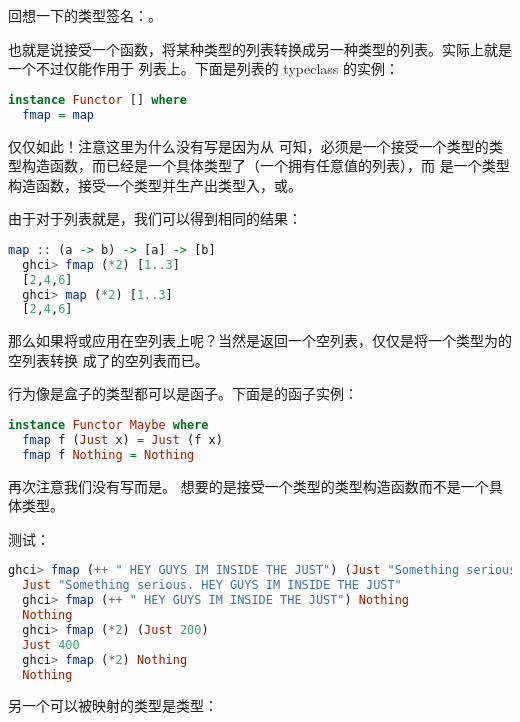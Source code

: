 \documentclass[./main.tex]{subfiles}
\begin{document}
回想一下的类型签名：。

也就是说接受一个函数，将某种类型的列表转换成另一种类型的列表。实际上就是一个不过仅能作用于
列表上。下面是列表的 typeclass 的实例：

\begin{lstlisting}[language=Haskell]
instance Functor [] where
  fmap = map
\end{lstlisting}

仅仅如此！注意这里为什么没有写是因为从
可知，必须是一个接受一个类型的类型构造函数，而\acode{[a]}已经是一个具体类型了（一个拥有任意值的列表），而
\acode{[]}是一个类型构造函数，接受一个类型并生产出类型入\acode{[Int]}，\acode{[String]}或\acode{[[String]]}。

由于对于列表就是，我们可以得到相同的结果：

\begin{lstlisting}[language=Haskell]
  map :: (a -> b) -> [a] -> [b]
  ghci> fmap (*2) [1..3]
  [2,4,6]
  ghci> map (*2) [1..3]
  [2,4,6]
\end{lstlisting}

那么如果将或应用在空列表上呢？当然是返回一个空列表，仅仅是将一个类型为\acode{[a]}的空列表转换
成了\acode{[b]}的空列表而已。

行为像是盒子的类型都可以是函子。下面是的函子实例：

\begin{lstlisting}[language=Haskell]
instance Functor Maybe where
  fmap f (Just x) = Just (f x)
  fmap f Nothing = Nothing
\end{lstlisting}

再次注意我们没有写而是。
想要的是接受一个类型的类型构造函数而不是一个具体类型。

测试：

\begin{lstlisting}[language=Haskell]
  ghci> fmap (++ " HEY GUYS IM INSIDE THE JUST") (Just "Something serious.")
  Just "Something serious. HEY GUYS IM INSIDE THE JUST"
  ghci> fmap (++ " HEY GUYS IM INSIDE THE JUST") Nothing
  Nothing
  ghci> fmap (*2) (Just 200)
  Just 400
  ghci> fmap (*2) Nothing
  Nothing
\end{lstlisting}

另一个可以被映射的类型是类型：
\end{document}
